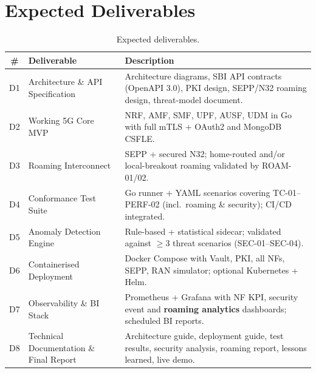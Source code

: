 \documentclass[11pt,a4paper]{report}
\begin{document}
\section{Expected Deliverables}
\begin{table}[h]
\centering
\footnotesize
\renewcommand{\arraystretch}{1.3}
\begin{tabularx}{\linewidth}{@{}c l X@{}}
\toprule
\textbf{\#} & \textbf{Deliverable} & \textbf{Description}\\
\midrule
D1 & Architecture \& API Specification & Architecture diagrams, SBI API contracts (OpenAPI 3.0), PKI design, SEPP/N32 roaming design, threat-model document.\\
D2 & Working 5G Core MVP & NRF, AMF, SMF, UPF, AUSF, UDM in Go with full mTLS + OAuth2 and MongoDB CSFLE.\\
D3 & Roaming Interconnect & SEPP + secured N32; home-routed and/or local-breakout roaming validated by ROAM-01/02.\\
D4 & Conformance Test Suite & Go runner + YAML scenarios covering TC-01--PERF-02 (incl.\ roaming \& security); CI/CD integrated.\\
D5 & Anomaly Detection Engine & Rule-based + statistical sidecar; validated against $\geq$3 threat scenarios (SEC-01--SEC-04).\\
D6 & Containerised Deployment & Docker Compose with Vault, PKI, all NFs, SEPP, RAN simulator; optional Kubernetes + Helm.\\
D7 & Observability \& BI Stack & Prometheus + Grafana with NF KPI, security event and \textbf{roaming analytics} dashboards; scheduled BI reports.\\
D8 & Technical Documentation \& Final Report & Architecture guide, deployment guide, test results, security analysis, roaming report, lessons learned, live demo.\\
\bottomrule
\end{tabularx}
\caption{Expected deliverables.}
\label{tab:deliverables}
\end{table}

\end{document}
